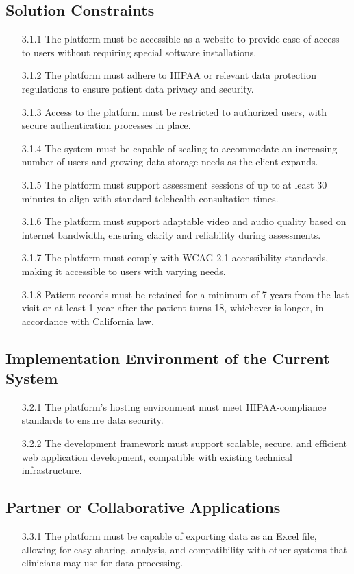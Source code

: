 \documentclass[12pt]{article}
\begin{document}
\subsection{Solution Constraints}
\begin{itemize}
  \item[3.1.1] The platform must be accessible as a website to provide ease of access to users without requiring special software installations.
  \item[3.1.2] The platform must adhere to HIPAA or relevant data protection regulations to ensure patient data privacy and security.
  \item[3.1.3] Access to the platform must be restricted to authorized users, with secure authentication processes in place.
  \item[3.1.4] The system must be capable of scaling to accommodate an increasing number of users and growing data storage needs as the client expands.
  \item[3.1.5] The platform must support assessment sessions of up to at least 30 minutes to align with standard telehealth consultation times.
  \item[3.1.6] The platform must support adaptable video and audio quality based on internet bandwidth, ensuring clarity and reliability during assessments.
  \item[3.1.7] The platform must comply with WCAG 2.1 accessibility standards, making it accessible to users with varying needs.
  \item[3.1.8] Patient records must be retained for a minimum of 7 years from the last visit or at least 1 year after the patient turns 18, whichever is 
  longer, in accordance with California law.
\end{itemize}
\subsection{Implementation Environment of the Current System}
\begin{itemize}
  \item[3.2.1] The platform’s hosting environment must meet HIPAA-compliance standards to ensure data security.
  \item[3.2.2] The development framework must support scalable, secure, and efficient web application development, compatible with existing technical 
  infrastructure.
\end{itemize}
\subsection{Partner or Collaborative Applications}
\begin{itemize}
  \item[3.3.1] The platform must be capable of exporting data as an Excel file, allowing for easy sharing, analysis, and compatibility with other systems
  that clinicians may use for data processing.
\end{itemize}
\end{document}
